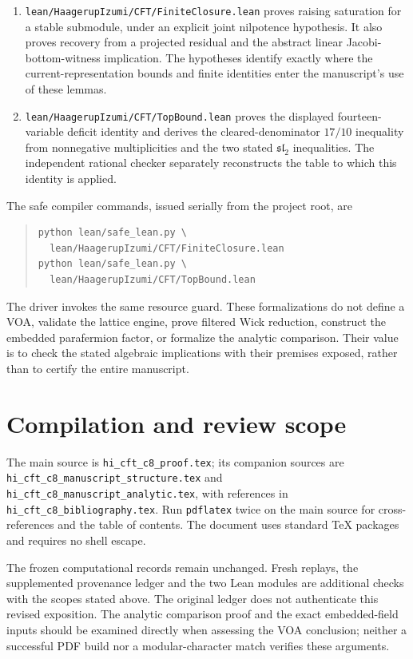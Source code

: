 \documentclass[11pt,a4paper]{article}
\theoremstyle{definition}
\newcommand{\artifact}[1]{\textnormal{\nolinkurl{#1}}}
\begin{document}
\begin{enumerate}
\item \artifact{lean/HaagerupIzumi/CFT/FiniteClosure.lean} proves
raising saturation for a stable submodule, under an explicit joint
nilpotence hypothesis. It also proves recovery from a projected
residual and the abstract linear Jacobi-bottom-witness implication.
The hypotheses identify exactly where the current-representation
bounds and finite identities enter the manuscript's use of these
lemmas.
\item \artifact{lean/HaagerupIzumi/CFT/TopBound.lean} proves the
displayed fourteen-variable deficit identity and derives the
cleared-denominator $17/10$ inequality from nonnegative
multiplicities and the two stated $\mathfrak{sl}_2$ inequalities.
The independent rational checker separately reconstructs the
table to which this identity is applied.
\end{enumerate}

The safe compiler commands, issued serially from the project root, are
\begin{quote}\small
\begin{verbatim}
python lean/safe_lean.py \
  lean/HaagerupIzumi/CFT/FiniteClosure.lean
python lean/safe_lean.py \
  lean/HaagerupIzumi/CFT/TopBound.lean
\end{verbatim}
\end{quote}
The driver invokes the same resource guard. These formalizations do
not define a VOA, validate the lattice engine, prove filtered Wick
reduction, construct the embedded parafermion factor, or formalize
the analytic comparison.
Their value is to check the stated algebraic implications with their
premises exposed, rather than to certify the entire manuscript.

\section{Compilation and review scope}\label{sec:compilation}
The main source is \artifact{hi_cft_c8_proof.tex}; its companion sources
are \artifact{hi_cft_c8_manuscript_structure.tex} and
\artifact{hi_cft_c8_manuscript_analytic.tex}, with references in
\artifact{hi_cft_c8_bibliography.tex}. Run \texttt{pdflatex} twice
on the main source for cross-references and the table of contents.
The document uses standard TeX packages and requires no shell escape.

The frozen computational records remain unchanged. Fresh replays,
the supplemented provenance ledger and the two Lean modules are
additional checks with the scopes stated above. The original ledger
does not authenticate this revised exposition. The analytic comparison
proof and the exact embedded-field inputs should be examined directly
when assessing the VOA conclusion; neither a successful PDF build nor
a modular-character match verifies these arguments.

\end{document}

